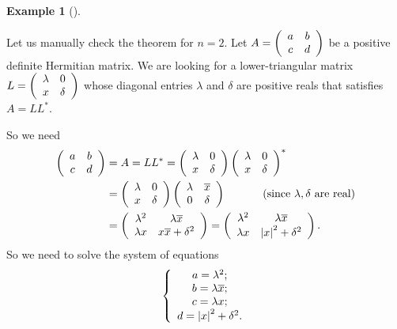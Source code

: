 \documentclass[numbers=enddot,12pt,final,onecolumn,notitlepage]{scrartcl}%
\numberwithin{exer}{subsection}
\theoremstyle{definition}
\newtheorem{exam}[theo]{Example}
\newenvironment{example}[1][]
{\begin{exam}[#1]\begin{leftbar}}
{\end{leftbar}\end{exam}}
\begin{document}
\begin{example}
Let us manually check the theorem for $n=2$. Let $A=\left(
\begin{array}
[c]{cc}%
a & b\\
c & d
\end{array}
\right)  $ be a positive definite Hermitian matrix. We are looking for a
lower-triangular matrix $L=\left(
\begin{array}
[c]{cc}%
\lambda & 0\\
x & \delta
\end{array}
\right)  $ whose diagonal entries $\lambda$ and $\delta$ are positive reals
that satisfies $A=LL^{\ast}$.

So we need%
\begin{align*}
\left(
\begin{array}
[c]{cc}%
a & b\\
c & d
\end{array}
\right)   &  =A=LL^{\ast}=\left(
\begin{array}
[c]{cc}%
\lambda & 0\\
x & \delta
\end{array}
\right)  \left(
\begin{array}
[c]{cc}%
\lambda & 0\\
x & \delta
\end{array}
\right)  ^{\ast}\\
&  =\left(
\begin{array}
[c]{cc}%
\lambda & 0\\
x & \delta
\end{array}
\right)  \left(
\begin{array}
[c]{cc}%
\lambda & \overline{x}\\
0 & \delta
\end{array}
\right)  \ \ \ \ \ \ \ \ \ \ \left(  \text{since }\lambda,\delta\text{ are
real}\right) \\
&  =\left(
\begin{array}
[c]{cc}%
\lambda^{2} & \lambda\overline{x}\\
\lambda x & x\overline{x}+\delta^{2}%
\end{array}
\right)  =\left(
\begin{array}
[c]{cc}%
\lambda^{2} & \lambda\overline{x}\\
\lambda x & \left\vert x\right\vert ^{2}+\delta^{2}%
\end{array}
\right)  .
\end{align*}
So we need to solve the system of equations%
\[
\left\{
\begin{array}
[c]{c}%
a=\lambda^{2};\\
b=\lambda\overline{x};\\
c=\lambda x;\\
d=\left\vert x\right\vert ^{2}+\delta^{2}.
\end{array}
\right.
\]



\end{example}
\end{document}
